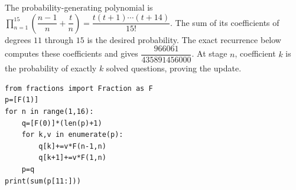 The probability-generating polynomial is $\prod_{n=1}^{15}(\dfrac{n-1}{n}+\dfrac{t}{n})=\dfrac{t(t+1)\cdots(t+14)}{15!}$. The sum of its coefficients of degrees $11$ through $15$ is the desired probability. The exact recurrence below computes these coefficients and gives $\boxed{\dfrac{966061}{435891456000}}$. At stage $n$, coefficient $k$ is the probability of exactly $k$ solved questions, proving the update.\begin{verbatim}
from fractions import Fraction as F
p=[F(1)]
for n in range(1,16):
    q=[F(0)]*(len(p)+1)
    for k,v in enumerate(p):
        q[k]+=v*F(n-1,n)
        q[k+1]+=v*F(1,n)
    p=q
print(sum(p[11:]))
\end{verbatim}
